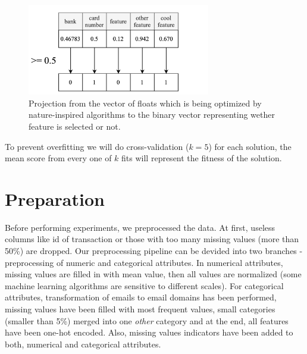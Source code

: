 \documentclass[runningheads]{llncs}
\begin{document}
\begin{figure}[ht]
	\begin{center}
	    \includegraphics[width=8cm]{figures/projection.png}
    \end{center}
	\caption{Projection from the vector of floats which is being optimized by nature-inspired algorithms to the binary vector representing wether feature is selected or not.}
	\label{fig:projection}
\end{figure}

To prevent overfitting we will do cross-validation ($k=5$) for each solution, the mean score from every one of $k$ fits will represent the fitness of the solution.




\section{Preparation}

Before performing experiments, we preprocessed the data. At first, useless columns like id of transaction or those with too many missing values (more than 50\%) are dropped. Our preprocessing pipeline can be devided into two branches - preprocessing of numeric and categorical attributes. In numerical attributes, missing values are filled in with mean value, then all values are normalized (some machine learning algorithms are sensitive to different scales). For categorical attributes, transformation of emails to email domains has been performed, missing values have been filled with most frequent values, small categories (smaller than 5\%) merged into one \textit{other} category and at the end, all features have been one-hot encoded. Also, missing values indicators have been added to both, numerical and categorical attributes.


\end{document}
